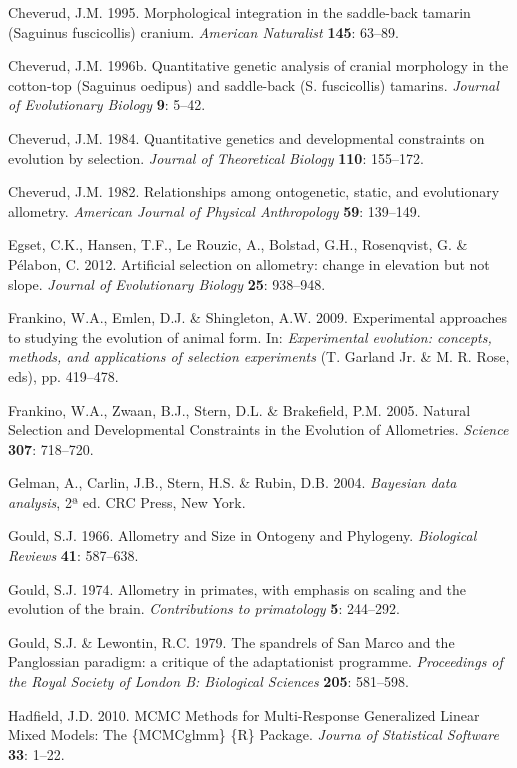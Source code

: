 \documentclass[12pt,]{article}
\begin{document}
Cheverud, J.M. 1995. Morphological integration in the saddle-back
tamarin (Saguinus fuscicollis) cranium. \emph{American Naturalist}
\textbf{145}: 63--89.

Cheverud, J.M. 1996b. Quantitative genetic analysis of cranial
morphology in the cotton-top (Saguinus oedipus) and saddle-back (S.
fuscicollis) tamarins. \emph{Journal of Evolutionary Biology}
\textbf{9}: 5--42.

Cheverud, J.M. 1984. Quantitative genetics and developmental constraints
on evolution by selection. \emph{Journal of Theoretical Biology}
\textbf{110}: 155--172.

Cheverud, J.M. 1982. Relationships among ontogenetic, static, and
evolutionary allometry. \emph{American Journal of Physical Anthropology}
\textbf{59}: 139--149.

Egset, C.K., Hansen, T.F., Le Rouzic, A., Bolstad, G.H., Rosenqvist, G.
\& Pélabon, C. 2012. Artificial selection on allometry: change in
elevation but not slope. \emph{Journal of Evolutionary Biology}
\textbf{25}: 938--948.

Frankino, W.A., Emlen, D.J. \& Shingleton, A.W. 2009. Experimental
approaches to studying the evolution of animal form. In:
\emph{Experimental evolution: concepts, methods, and applications of
selection experiments} (T. Garland Jr. \& M. R. Rose, eds), pp.
419--478.

Frankino, W.A., Zwaan, B.J., Stern, D.L. \& Brakefield, P.M. 2005.
Natural Selection and Developmental Constraints in the Evolution of
Allometries. \emph{Science} \textbf{307}: 718--720.

Gelman, A., Carlin, J.B., Stern, H.S. \& Rubin, D.B. 2004.
\emph{Bayesian data analysis}, 2ª ed. CRC Press, New York.

Gould, S.J. 1966. Allometry and Size in Ontogeny and Phylogeny.
\emph{Biological Reviews} \textbf{41}: 587--638.

Gould, S.J. 1974. Allometry in primates, with emphasis on scaling and
the evolution of the brain. \emph{Contributions to primatology}
\textbf{5}: 244--292.

Gould, S.J. \& Lewontin, R.C. 1979. The spandrels of San Marco and the
Panglossian paradigm: a critique of the adaptationist programme.
\emph{Proceedings of the Royal Society of London B: Biological Sciences}
\textbf{205}: 581--598.

Hadfield, J.D. 2010. MCMC Methods for Multi-Response Generalized Linear
Mixed Models: The \{MCMCglmm\} \{R\} Package. \emph{Journa of
Statistical Software} \textbf{33}: 1--22.
\end{document}
